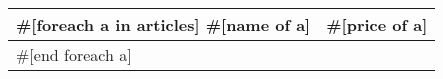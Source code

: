 \documentclass{article}
\begin{document}
\begin{center}
    \begin{tabular}{ l r }
        \hline
        #[foreach a in articles]
        #[name of a] & #[price of a] \\ \hline
        #[end foreach a]
        \hline
    \end{tabular}
\end{center}
\end{document}
